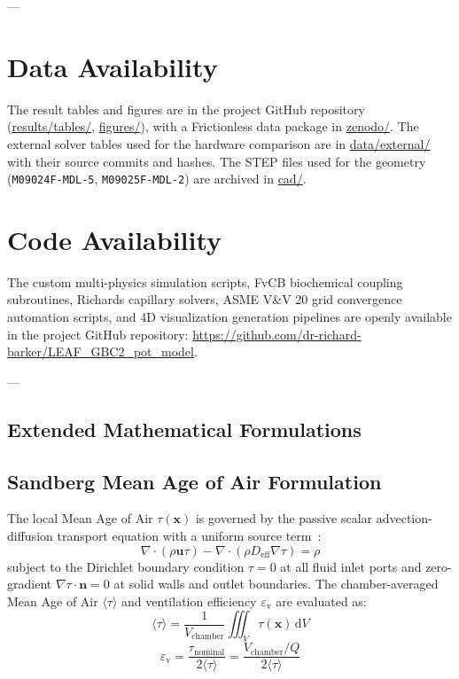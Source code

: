 \documentclass[pdflatex,sn-nature,iicol]{sn-jnl}
\begin{document}
---

\section*{Data Availability}\label{sec:data_avail}

The result tables and figures are in the project GitHub repository (\url{results/tables/}, \url{figures/}), with a Frictionless data package in \url{zenodo/}. The external solver tables used for the hardware comparison are in \url{data/external/} with their source commits and hashes. The STEP files used for the geometry (\texttt{M09024F-MDL-5}, \texttt{M09025F-MDL-2}) are archived in \url{cad/}.

\section*{Code Availability}\label{sec:code_avail}

The custom multi-physics simulation scripts, FvCB biochemical coupling subroutines, Richards capillary solvers, ASME V\&V 20 grid convergence automation scripts, and 4D visualization generation pipelines are openly available in the project GitHub repository: \url{https://github.com/dr-richard-barker/LEAF_GBC2_pot_model}.

---

\begin{appendices}

\section{Extended Mathematical Formulations}\label{sec:appendix_math}

\subsection{Sandberg Mean Age of Air Formulation}\label{sec:sandberg_math}

The local Mean Age of Air $\tau(\mathbf{x})$ is governed by the passive scalar advection-diffusion transport equation with a uniform source term~\cite{sandberg1981ventilation}:
\begin{equation}
\nabla \cdot (\rho \mathbf{u} \tau) - \nabla \cdot (\rho D_{\mathrm{eff}} \nabla \tau) = \rho
\label{eq:age_pde}
\end{equation}
subject to the Dirichlet boundary condition $\tau = 0$ at all fluid inlet ports and zero-gradient $\nabla \tau \cdot \mathbf{n} = 0$ at solid walls and outlet boundaries. The chamber-averaged Mean Age of Air $\langle \tau \rangle$ and ventilation efficiency $\varepsilon_{\mathrm{v}}$ are evaluated as:
\begin{equation}
\langle \tau \rangle = \frac{1}{V_{\mathrm{chamber}}} \iiint_{V} \tau(\mathbf{x}) \, \mathrm{d}V
\label{eq:mean_tau}
\end{equation}
\begin{equation}
\varepsilon_{\mathrm{v}} = \frac{\tau_{\mathrm{nominal}}}{2 \langle \tau \rangle} = \frac{V_{\mathrm{chamber}} / Q}{2 \langle \tau \rangle}
\label{eq:vent_eff}
\end{equation}

\end{appendices}
\end{document}
